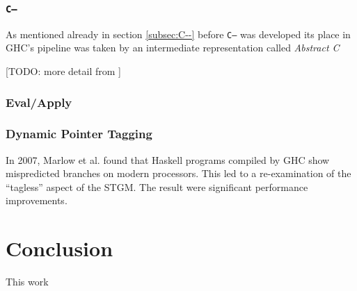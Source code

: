 \documentclass[runningheads]{llncs}
\begin{document}
\subsubsection{\texttt{C--}}
As mentioned already in section \ref{subsec:C--} before \texttt{C--} was developed its place in GHC's pipeline was taken by an intermediate representation called \textit{Abstract C}

[TODO: more detail from  \cite{jones1999c}] 

\subsubsection{Eval/Apply}

\subsubsection{Dynamic Pointer Tagging}
In 2007, Marlow et al.\cite{marlow2007faster} found that Haskell programs compiled by GHC show mispredicted branches on modern processors. This led to a re-examination of the \enquote{tagless} aspect of the STGM. The result were significant performance improvements.


\section{Conclusion}
\label{sec:conclusion}

This work 


%
%
\newpage


\end{document}
